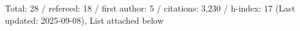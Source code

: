 Total: 28 / refereed: 18 / first author: 5 / citations: 3,230 / h-index: 17 (Last updated: 2025-09-08), List attached below